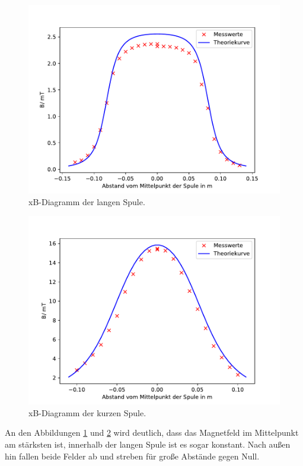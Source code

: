 \begin{figure}[H]
  \centering
  \includegraphics{LangeSpule.pdf}
  \caption{xB-Diagramm der langen Spule.}
  \label{fig:LangeSpule}
\end{figure}
\begin{figure}[H]
  \includegraphics{KurzeSpule.pdf}
  \caption{xB-Diagramm der kurzen Spule.}
  \label{fig:KurzeSpule}
\end{figure}

An den Abbildungen \ref{fig:LangeSpule} und \ref{fig:KurzeSpule}
wird deutlich, dass das Magnetfeld im Mittelpunkt
am stärksten ist, innerhalb der langen Spule ist es
sogar konstant. Nach außen hin fallen beide Felder
ab und streben für große Abstände gegen Null.



\label{sec:Auswertung}

